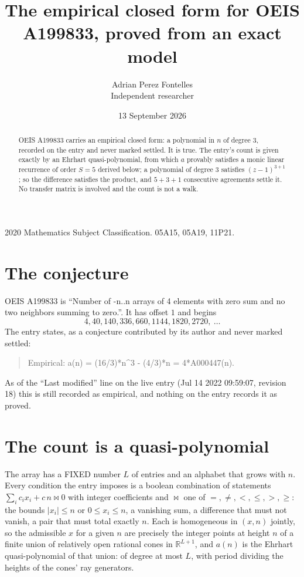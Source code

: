 \documentclass[11pt,a4paper]{article}
\title{The empirical closed form for OEIS A199833, proved from an exact model}
\author{Adrian Perez Fontelles\\ \small Independent researcher}
\date{13 September 2026}
\theoremstyle{plain}
\theoremstyle{definition}
\begin{document}
\maketitle

\begin{abstract}
OEIS A199833 carries an empirical closed form: a polynomial in $n$ of degree $3$, recorded on the
entry and never marked settled. It is true. The entry's count is given exactly by an Ehrhart
quasi-polynomial, from which $a$ provably satisfies a monic linear recurrence of order $S=5$
derived below; a polynomial of degree $3$ satisfies $(z-1)^{3+1}$; so the difference
satisfies the product, and $5+3+1$ consecutive agreements settle it. No transfer matrix is
involved and the count is not a walk.
\end{abstract}

\noindent\small 2020 Mathematics Subject Classification. 05A15, 05A19, 11P21.\normalsize

\section{The conjecture}

OEIS A199833 is ``Number of -n..n arrays of 4 elements with zero sum and no two neighbors summing to zero.''. It has offset $1$ and begins
\[
4, 40, 140, 336, 660, 1144, 1820, 2720,\ \dots
\]
The entry states, as a conjecture contributed by its author and never marked settled:
\begin{quote}
Empirical: a(n) = (16/3)*n\^{}3 - (4/3)*n = 4*A000447(n).
\end{quote}
As of the ``Last modified'' line on the live entry (Jul 14 2022 09:59:07, revision 18)
this is still recorded as empirical, and nothing on the entry records it as proved.

\section{The count is a quasi-polynomial}

The array has a FIXED number $L$ of entries and an alphabet that grows with $n$. Every
condition the entry imposes is a boolean combination of statements
$\sum_i c_ix_i + c\,n \bowtie 0$ with integer coefficients and $\bowtie$ one of
$=,\ne,<,\le,>,\ge$: the bounds $|x_i|\le n$ or $0\le x_i\le n$, a vanishing sum, a difference
that must not vanish, a pair that must total exactly $n$. Each is homogeneous in $(x,n)$
jointly, so the admissible $x$ for a given $n$ are precisely the integer points at height $n$
of a finite union of relatively open rational cones in $\mathbb{R}^{L+1}$, and $a(n)$ is
the Ehrhart quasi-polynomial of that union: of degree at most $L$, with period dividing the
heights of the cones' ray generators.
\end{document}
